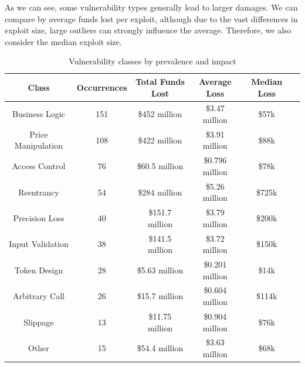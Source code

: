 \newpage

As we can see, some vulnerability types generally lead to larger damages. We can compare by average funds lost per exploit, although due to the vast differences in exploit size, large outliers can strongly influence the average. Therefore, we also consider the median exploit size.

\begin{table}[h!]
\centering
{\setlength{\extrarowheight}{5pt}
\begin{tabular}{  c  c  c  c  c  c }
  \toprule
  Class                            & Occurrences & Total Funds Lost & Average Loss    & Median Loss \\[4pt]
  \midrule
  Business Logic           & 151                  & \$452 million      &\$3.47 million    & \$57k             \\[3pt]
  Price Manipulation   & 108                  & \$422 million      & \$3.91 million   & \$88k             \\[3pt]
  Access Control          & 76                    & \$60.5 million     & \$0.796 million & \$78k             \\[3pt]
  Reentrancy                 & 54                    & \$284 million      & \$5.26 million   & \$725k           \\[3pt]
  Precision Loss            & 40                    & \$151.7 million   & \$3.79 million   & \$200k           \\[3pt]
  Input Validation         & 38                    & \$141.5 million   & \$3.72 million   & \$150k           \\[3pt]
  Token Design             & 28                    & \$5.63 million      & \$0.201 million & \$14k            \\[3pt]
  Arbitrary Call              & 26                    & \$15.7 million     & \$0.604 million & \$114k           \\[3pt]
  Slippage                      & 13                    & \$11.75 million   & \$0.904 million & \$76k             \\[3pt]
  Other                           & 15                    & \$54.4 million     & \$3.63 million   & \$68k             \\[3pt]
  \bottomrule
\end{tabular}
}
\caption{Vulnerability classes by prevalence and impact}
\label{table:vulnerability_classes}
\end{table}

